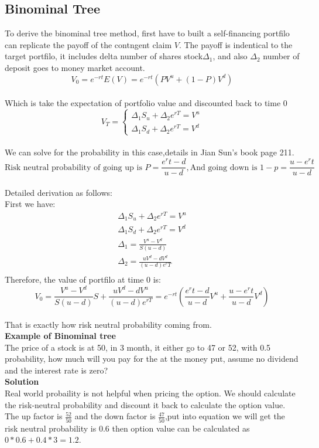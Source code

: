 \documentclass[a4paper,11pt]{article}
\begin{document}
\subsection{Binominal Tree}
To derive the binominal tree method, first have to built a self-financing portfilo can replicate the payoff of the contngent claim $V$. The payoff is indentical to the target portfilo, it includes delta number of shares stock$\Delta_1$, and also $\Delta_2$ number of deposit goes to money market account.\\
$$ V_0=e^{-rt}E(V)=e^{-rt}(PV^u+(1-P)V^d)$$ \\
Which is take the expectation of portfolio value and discounted back to time 0\\
$$
V_T=
\begin{cases}
  \Delta_1S_u+\Delta_2e^{rT}=V^u\\ \Delta_1S_d+\Delta_2e^{rT}=V^d
\end{cases}
$$\\
We can solve for the probability in this case,details in Jian Sun's book page 211.
$$\mbox {Risk neutral probability of going up is $P=\frac{e^rt-d}{u-d}$},
 \mbox{And going down is $1-p=\frac{u-e^rt}{u-d}$}$$ \\
Detailed derivation as follows:\\
First we have:\\
\begin{equation}
\begin{aligned}
\Delta_1S_u+\Delta_2e^{rT}=V^u\\
\Delta_1S_d+\Delta_2e^{rT}=V^d \\
\Delta_1=\frac{V^u-V^d}{S(u-d)}\\
\Delta_2=\frac{uV^d-dV^d}{(u-d)e^rT}\\
 \end{aligned}
\end{equation}
Therefore, the value of portfilo at time 0 is:
$$V_0=\frac{V^u-V^d}{S(u-d)}S+\frac{uV^d-dV^u}{(u-d)e^{rT}}=e^{-rt}\left(\frac{e^rt-d}{u-d}V^u+\frac{u-e^rt}{u-d}V^d\right)$$\\
That is exactly how risk neutral probability coming from.\\
{\bf Example of Binominal tree}\\
The price of a stock is at 50, in 3 month, it either go to 47 or 52, with 0.5 probability, how much will you pay for the at the money put, assume no dividend and the interest rate is zero?\\
{\bf Solution}\\
Real world probaility is not helpful when pricing the option. We should calculate the risk-neutral probability and discount it back to calculate the option value. The up factor is $\frac{52}{50}$ and the down factor is $\frac{47}{50}$,put into equation we will get the risk neutral probability is 0.6 then option value can be calculated as $0*0.6+0.4*3=1.2$.\\
\end{document}
